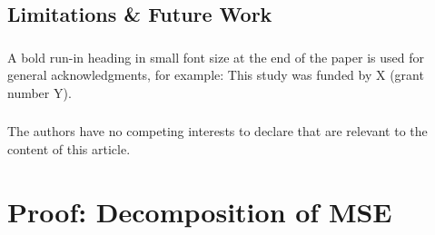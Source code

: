 \documentclass[runningheads]{llncs}
\begin{document}
\subsection{Limitations \& Future Work}

\begin{credits}
    \subsubsection{\ackname} A bold run-in heading in small font size at the end of the paper is used for
    general acknowledgments, for example: This study was funded by X (grant number
    Y).

    \subsubsection{\discintname}
    The authors have no competing interests to declare that are relevant to the
    content of this article.
\end{credits}

%



\newpage
\appendix
\section{Proof: Decomposition of MSE}\label{app:proof-mse-decomposition}
\end{document}
